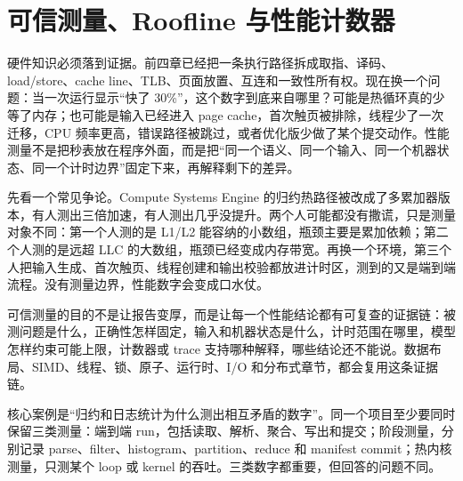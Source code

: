 \chapter{可信测量、Roofline 与性能计数器}

硬件知识必须落到证据。前四章已经把一条执行路径拆成取指、译码、load/store、cache line、TLB、页面放置、互连和一致性所有权。现在换一个问题：当一次运行显示“快了 30\%”，这个数字到底来自哪里？可能是热循环真的少等了内存；也可能是输入已经进入 page cache，首次触页被排除，线程少了一次迁移，CPU 频率更高，错误路径被跳过，或者优化版少做了某个提交动作。性能测量不是把秒表放在程序外面，而是把“同一个语义、同一个输入、同一个机器状态、同一个计时边界”固定下来，再解释剩下的差异。

先看一个常见争论。Compute Systems Engine 的归约热路径被改成了多累加器版本，有人测出三倍加速，有人测出几乎没提升。两个人可能都没有撒谎，只是测量对象不同：第一个人测的是 L1/L2 能容纳的小数组，瓶颈主要是累加依赖；第二个人测的是远超 LLC 的大数组，瓶颈已经变成内存带宽。再换一个环境，第三个人把输入生成、首次触页、线程创建和输出校验都放进计时区，测到的又是端到端流程。没有测量边界，性能数字会变成口水仗。

可信测量的目的不是让报告变厚，而是让每一个性能结论都有可复查的证据链：被测问题是什么，正确性怎样固定，输入和机器状态是什么，计时范围在哪里，模型怎样约束可能上限，计数器或 trace 支持哪种解释，哪些结论还不能说。数据布局、SIMD、线程、锁、原子、运行时、I/O 和分布式章节，都会复用这条证据链。

\begin{casebox}
核心案例是“归约和日志统计为什么测出相互矛盾的数字”。同一个项目至少要同时保留三类测量：端到端 run，包括读取、解析、聚合、写出和提交；阶段测量，分别记录 parse、filter、histogram、partition、reduce 和 manifest commit；热内核测量，只测某个 loop 或 kernel 的吞吐。三类数字都重要，但回答的问题不同。
\end{casebox}

